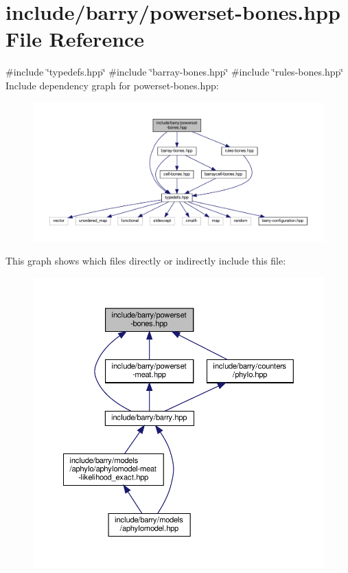 \hypertarget{powerset-bones_8hpp}{}\section{include/barry/powerset-\/bones.hpp File Reference}
\label{powerset-bones_8hpp}
{\ttfamily \#include \char`\"{}typedefs.\+hpp\char`\"{}}\newline
{\ttfamily \#include \char`\"{}barray-\/bones.\+hpp\char`\"{}}\newline
{\ttfamily \#include \char`\"{}rules-\/bones.\+hpp\char`\"{}}\newline
Include dependency graph for powerset-\/bones.hpp\+:\nopagebreak
\begin{figure}[H]
\begin{center}
\leavevmode
\includegraphics[width=350pt]{powerset-bones_8hpp__incl}
\end{center}
\end{figure}
This graph shows which files directly or indirectly include this file\+:
\nopagebreak
\begin{figure}[H]
\begin{center}
\leavevmode
\includegraphics[width=350pt]{powerset-bones_8hpp__dep__incl}
\end{center}
\end{figure}
